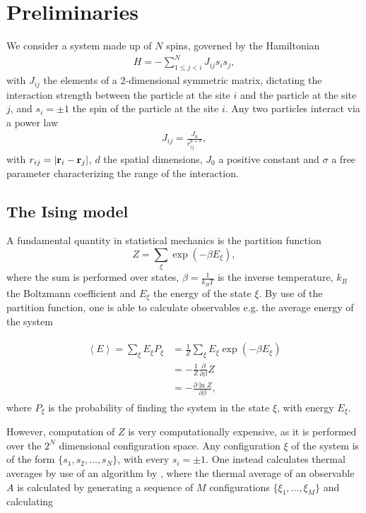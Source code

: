 \section{Preliminaries}

We consider a system made up of $N$ spins, governed by the Hamiltonian
\begin{align}
	H = -\sum^N_{1\le j < i} J_{ij} s_i s_j,
	\label{eq:connected-Hamiltonian}
\end{align}
with $J_{ij}$ the elements of a 2-dimensional symmetric matrix, dictating the interaction strength between the particle at the site $i$ and the particle at the site $j$, and $s_i = \pm 1$ the spin of the particle at the site $i$.
Any two particles interact via a power law
\begin{align}
	J_{ij} =  \frac{J_0}{r^{d+\sigma}_{ij}},
\end{align}
with $r_{ij} = \lvert \textbf{r}_i - \textbf{r}_j \rvert$, $d$ the spatial dimensions, $J_0$ a positive constant and $\sigma$ a free parameter characterizing the range of the interaction. %

\subsection{The Ising model}

A fundamental quantity in statistical mechanics is the partition function \[
	Z = \sum_\xi \exp (-\beta E_{\xi}),
\]
where the sum is performed over states, $\beta =  \frac{1}{k_B T}$ is the inverse temperature, $k_B$ the Boltzmann coefficient and $E_\xi$ the energy of the state $\xi$. By use of the partition function, one is able to calculate observables e.g. the average energy of the system 

\begin{align}
	\begin{split}
	\left< E\right> = 	\sum_\xi E_\xi P_\xi &=  \frac{1}{Z}\sum_\xi E_\xi \exp{(-\beta E_\xi)} \\
									   &= - \frac{1}{Z} \frac{\partial }{\partial \beta } Z \\
									   &= - \frac{\partial \ln Z}{\partial \beta},
	\end{split}
\end{align}
where $P_\xi$ is the probability of finding the system in the state $\xi$, with energy $E_\xi$.


However, computation of $Z$ is very computationally expensive, as it is performed over the 
$2^N$ dimensional configuration space. Any configuration $\xi$ of the system is of the form $\{ s_1, s_2, \ldots, s_N\} $, with every $s_i = \pm 1$.
One instead calculates thermal averages by use of an algorithm by \cite{Metropolis1953}, where the thermal average of an observable $A$ is calculated by generating a sequence of $M$ configurations $\{ \xi_1, \ldots, \xi_M \}$ and calculating  


